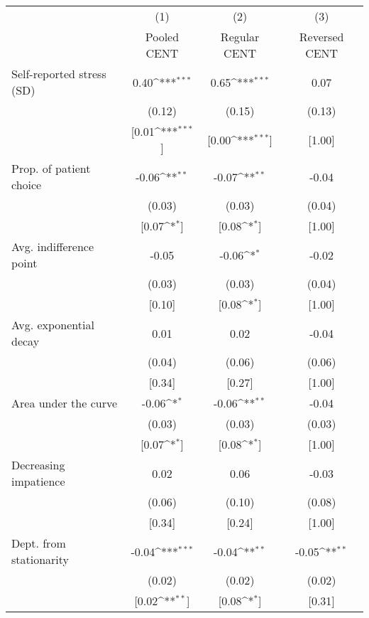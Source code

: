 {
\def\sym#1{\ifmmode^{#1}\else\(^{#1}\)\fi}
\begin{tabular}{l*{3}{c}}
\toprule
          &\multicolumn{1}{c}{(1)}&\multicolumn{1}{c}{(2)}&\multicolumn{1}{c}{(3)}\\
          &\multicolumn{1}{c}{Pooled CENT}&\multicolumn{1}{c}{Regular CENT}&\multicolumn{1}{c}{Reversed CENT}\\
\midrule
Self-reported stress (SD)&0.40\sym{***}&0.65\sym{***}&     0.07\\
          &   (0.12)&   (0.15)&   (0.13)\\
          &[0.01\sym{***}]&[0.00\sym{***}]&   [1.00]\\
Prop. of patient choice&-0.06\sym{**}&-0.07\sym{**}&    -0.04\\
          &   (0.03)&   (0.03)&   (0.04)\\
          &[0.07\sym{*}]&[0.08\sym{*}]&   [1.00]\\
Avg. indifference point&    -0.05&-0.06\sym{*}&    -0.02\\
          &   (0.03)&   (0.03)&   (0.04)\\
          &   [0.10]&[0.08\sym{*}]&   [1.00]\\
Avg. exponential decay&     0.01&     0.02&    -0.04\\
          &   (0.04)&   (0.06)&   (0.06)\\
          &   [0.34]&   [0.27]&   [1.00]\\
Area under the curve&-0.06\sym{*}&-0.06\sym{**}&    -0.04\\
          &   (0.03)&   (0.03)&   (0.03)\\
          &[0.07\sym{*}]&[0.08\sym{*}]&   [1.00]\\
Decreasing impatience&     0.02&     0.06&    -0.03\\
          &   (0.06)&   (0.10)&   (0.08)\\
          &   [0.34]&   [0.24]&   [1.00]\\
Dept. from stationarity&-0.04\sym{***}&-0.04\sym{**}&-0.05\sym{**}\\
          &   (0.02)&   (0.02)&   (0.02)\\
          &[0.02\sym{**}]&[0.08\sym{*}]&   [0.31]\\
\bottomrule
\end{tabular}
}
